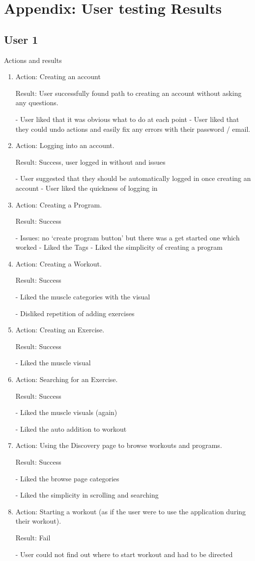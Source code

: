 \documentclass[12pt, titlepage]{article}
\begin{document}
\newpage{}
\section{Appendix: User testing Results}
\subsection{User 1}
Actions and results
\begin{enumerate}
\item Action: Creating an account

Result: User successfully found path to creating an account without asking any questions.

-	User liked that it was obvious what to do at each point
-	User liked that they could undo actions and easily fix any errors with their password / email.

\item Action: Logging into an account.

Result: Success, user logged in without and issues

-	User suggested that they should be automatically logged in once creating an account
-	User liked the quickness of logging in

\item Action: Creating a Program.

Result: Success 

-	Issues: no ‘create program button’ but there was a get started one which worked
-	Liked the Tags
-	Liked the simplicity of creating a program

\item Action: Creating a Workout.

Result: Success

-	Liked the muscle categories with the visual

-	Disliked repetition of adding exercises

\item Action: Creating an Exercise.

Result: Success

-	Liked the muscle visual

\item Action: Searching for an Exercise.

Result: Success

-	Liked the muscle visuals (again)

-	Liked the auto addition to workout

\item Action: Using the Discovery page to browse workouts and programs.

Result: Success

-	Liked the browse page categories

-	Liked the simplicity in scrolling and searching


\item Action: Starting a workout (as if the user were to use the application during their workout).

Result: Fail

-	User could not find out where to start workout and had to be directed
\end{enumerate}
\end{document}
